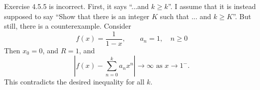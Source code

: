 \documentclass{article}
\begin{document}
Exercise 4.5.5 is incorrect. First, it says ``...and $k \geq k$''. I assume that it is instead supposed to say ``Show that there is an integer $K$ such that ... and $k \geq K$''. But still, there is a counterexample. Consider
\begin{equation*}
    f(x) = \frac 1 {1 - x}, \qquad a_n = 1, \quad n \geq 0
\end{equation*}
Then $x_0 = 0$, and $R = 1$, and
\begin{equation*}
    \left|f(x) - \sum_{n = 0}^k a_n x^n\right| \to \infty \text{ as } x \to 1^-.
\end{equation*}
This contradicts the desired inequality for all $k$.
\end{document}
